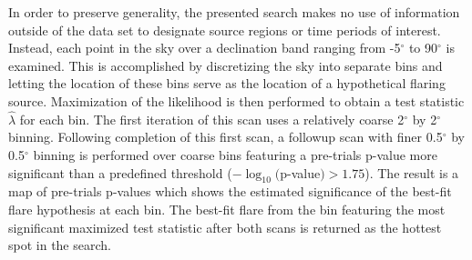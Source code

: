 \documentclass[manuscript]{aastex}
\begin{document}
In order to preserve generality, the presented search makes no use of information outside of the data set to designate source regions or time periods of interest. Instead, each point in the sky over a declination band ranging from -5$^{\circ}$ to 90$^{\circ}$ is examined. This is accomplished by discretizing the sky into separate bins and letting the location of these bins serve as the location of a hypothetical flaring source. Maximization of the likelihood is then performed to obtain a test statistic $\hat{\lambda}$ for each bin. The first iteration of this scan uses a relatively coarse 2$^{\circ}$ by 2$^{\circ}$ binning. Following completion of this first scan, a followup scan with finer 0.5$^{\circ}$ by 0.5$^{\circ}$ binning is performed over coarse bins featuring a pre-trials p-value more significant than a predefined threshold ($-\log_{10}($p-value$) > 1.75$). The result is a map of pre-trials p-values which shows the estimated significance of the best-fit flare hypothesis at each bin. The best-fit flare from the bin featuring the most significant maximized test statistic after both scans is returned as the hottest spot in the search.
\end{document}
